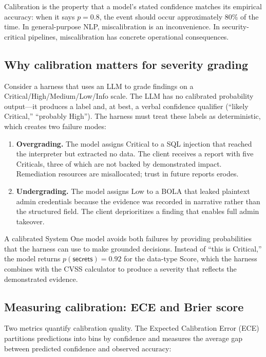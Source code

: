 \documentclass[conference]{IEEEtran}
\begin{document}
Calibration is the property that a model's stated confidence matches its empirical accuracy: when it says $p = 0.8$, the event should occur approximately 80\% of the time. In general-purpose NLP, miscalibration is an inconvenience. In security-critical pipelines, miscalibration has concrete operational consequences.

\subsection{Why calibration matters for severity grading}

Consider a harness that uses an LLM to grade findings on a Critical/High/Medium/Low/Info scale. The LLM has no calibrated probability output---it produces a label and, at best, a verbal confidence qualifier (``likely Critical,'' ``probably High''). The harness must treat these labels as deterministic, which creates two failure modes:

\begin{enumerate}[leftmargin=*]
\item \textbf{Overgrading.} The model assigns Critical to a SQL injection that reached the interpreter but extracted no data. The client receives a report with five Criticals, three of which are not backed by demonstrated impact. Remediation resources are misallocated; trust in future reports erodes.
\item \textbf{Undergrading.} The model assigns Low to a BOLA that leaked plaintext admin credentials because the evidence was recorded in narrative rather than the structured field. The client deprioritizes a finding that enables full admin takeover.
\end{enumerate}

A calibrated System One model avoids both failures by providing probabilities that the harness can use to make grounded decisions. Instead of ``this is Critical,'' the model returns $p(\textsf{secrets}) = 0.92$ for the data-type Score, which the harness combines with the CVSS calculator to produce a severity that reflects the demonstrated evidence.

\subsection{Measuring calibration: ECE and Brier score}

Two metrics quantify calibration quality. The Expected Calibration Error (ECE) partitions predictions into bins by confidence and measures the average gap between predicted confidence and observed accuracy:
\end{document}

